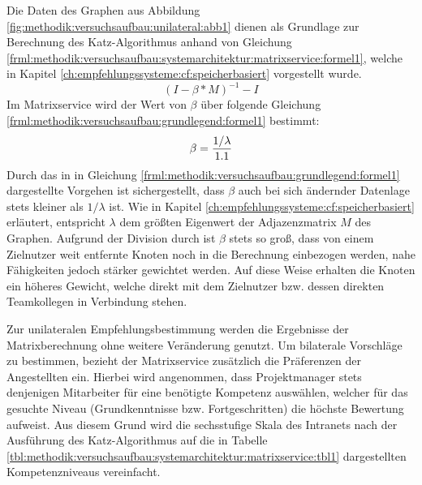 Die Daten des Graphen aus Abbildung \ref{fig:methodik:versuchsaufbau:unilateral:abb1} dienen als Grundlage zur Berechnung des Katz-Algorithmus anhand von Gleichung \ref{frml:methodik:versuchsaufbau:systemarchitektur:matrixservice:formel1}, welche in Kapitel \ref{ch:empfehlungssysteme:cf:speicherbasiert} vorgestellt wurde.
\begin{equation}
	(I - \beta * M)^{-1} - I
	\label{frml:methodik:versuchsaufbau:systemarchitektur:matrixservice:formel1}
\end{equation}
Im Matrixservice wird der Wert von $\beta$ über folgende Gleichung \ref{frml:methodik:versuchsaufbau:grundlegend:formel1} bestimmt:
\begin{equation}
	\beta = \frac{1/\lambda}{1.1}
	\label{frml:methodik:versuchsaufbau:grundlegend:formel1}
\end{equation}
Durch das in in Gleichung \ref{frml:methodik:versuchsaufbau:grundlegend:formel1} dargestellte Vorgehen ist sichergestellt, dass $\beta$ auch bei sich ändernder Datenlage stets kleiner als $1/\lambda$ ist. Wie in Kapitel \ref{ch:empfehlungssysteme:cf:speicherbasiert} erläutert, entspricht $\lambda$ dem größten Eigenwert der Adjazenzmatrix $M$ des Graphen. Aufgrund der Division durch \nenner ist $\beta$ stets so groß, dass von einem Zielnutzer weit entfernte Knoten noch in die Berechnung einbezogen werden, nahe Fähigkeiten jedoch stärker gewichtet werden. Auf diese Weise erhalten die Knoten ein höheres Gewicht, welche direkt mit dem Zielnutzer bzw. dessen direkten Teamkollegen in Verbindung stehen.

Zur unilateralen Empfehlungsbestimmung werden die Ergebnisse der Matrixberechnung ohne weitere Veränderung genutzt. Um bilaterale Vorschläge zu bestimmen, bezieht der Matrixservice zusätzlich die Präferenzen der Angestellten ein. Hierbei wird angenommen, dass Projektmanager stets denjenigen Mitarbeiter für eine benötigte Kompetenz auswählen, welcher für das gesuchte Niveau (Grundkenntnisse bzw. Fortgeschritten) die höchste Bewertung aufweist. Aus diesem Grund wird die sechsstufige Skala des Intranets nach der Ausführung des Katz-Algorithmus auf die in Tabelle \ref{tbl:methodik:versuchsaufbau:systemarchitektur:matrixservice:tbl1} dargestellten Kompetenzniveaus vereinfacht. 

